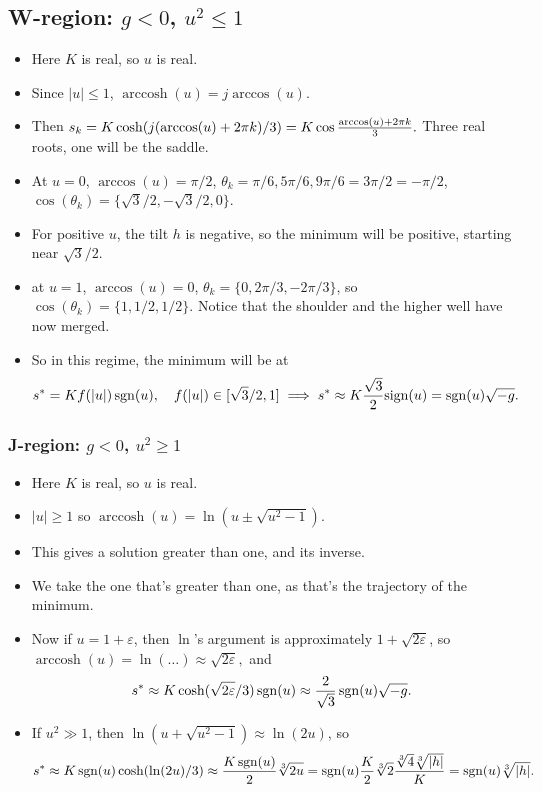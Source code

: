 \documentclass[10pt]{article}
\newcommand{\veps}{\varepsilon}
\DeclareMathOperator*{\arccosh}{arccosh}
\DeclareMathOperator*{\sign}{sgn}
\begin{document}
\subsection*{W-region: $g<0$, $u^2 \le 1$}
\begin{itemize}
\item Here $K$ is real, so $u$ is real.
\item Since $|u| \le 1$, $\arccosh(u) = j \arccos(u)$.
\item Then $s_k = K \cosh(j(\arccos(u) + 2 \pi k)/3) = K \cos{\arccos(u) + 2\pi k \over 3}.$ Three real roots, one will be the saddle.
  \item At $u = 0$, $\arccos(u) = \pi/2$, $\theta_k = {\pi/6, 5\pi/6, 9\pi/6 = 3\pi/2 = -\pi/2}$, $\cos(\theta_k) = \{\sqrt{3}/2, -\sqrt{3}/2, 0\}.$ 
  \item For positive $u$, the tilt $h$ is negative, so the minimum will be positive, starting near $\sqrt{3}/2$. 
  \item at $u = 1$, $\arccos(u) = 0$, $\theta_k = \{0, 2\pi/3, -2\pi/3\}$, so $\cos(\theta_k) = \{1, 1/2, 1/2\}.$ Notice that the shoulder and the higher well have now merged.
  \item So in this regime, the minimum will be at $$s^* = K f(|u|) \sign(u), \quad f(|u|)\in [\sqrt{3}/2, 1] \implies s^* \approx K {\sqrt{3} \over 2} \text{sign}(u) = \sign(u) \sqrt{-g}.$$
\end{itemize}
\subsubsection*{J-region: $g<0$, $u^2 \ge 1$}
\begin{itemize}
\item Here $K$ is real, so $u$ is real.
\item $|u| \ge 1$ so $\arccosh(u) = \ln(u \pm \sqrt{u^2 -1})$.
\item This gives a solution greater than one, and its inverse.
\item We take the one that's greater than one, as that's the trajectory of the minimum.
\item Now if $u = 1+ \veps$, then $\ln$'s argument is approximately $1 + \sqrt{2 \veps}$, so $\arccosh(u) = \ln(\dots) \approx \sqrt{2 \veps},$ and $$ s^* \approx K \cosh(\sqrt{2\veps}/3)\sign(u) \approx {2\over \sqrt{3}} \sign(u) \sqrt{-g}.$$
\item If $u^2 \gg 1$, then $\ln(u + \sqrt{u^2-1}) \approx \ln(2u)$, so $$ s^* \approx K \sign(u) \cosh(\ln(2u)/3) \approx {K \sign(u) \over 2} \sqrt[3]{2u} = \sign(u) {K \over 2} \sqrt[3]{2} { \sqrt[3]{4} \sqrt[3]{|h|} \over K} = \sign(u) \sqrt[3]{|h|}.$$ 
  \end{itemize}
\end{document}
